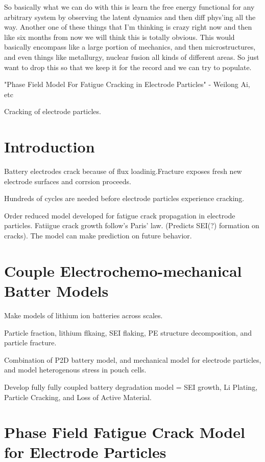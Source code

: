 \documentclass[book.tex]{subfiles}
\begin{document}
So basically what we can do with this is learn the free energy functional for any arbitrary system by observing the latent dynamics and then diff phys'ing all the way. Another one of these things that I'm thinking is crazy right now and then like six months from now we will think this is totally obvious. This would basically encompass like a large portion of mechanics, and then microstructures, and even things like metallurgy, nuclear fusion all kinds of different areas. So just want to drop this so that we keep it for the record and we can try to populate.

"Phase Field Model For Fatigue Cracking in Electrode Particles" - Weilong Ai, etc

Cracking of electrode particles. 

\section{Introduction}

Battery electrodes crack because of flux loadinig.Fracture exposes fresh new electrode surfaces and corrsion proceeds.

Hundreds of cycles are needed before electrode particles experience cracking.

Order reduced model developed for fatigue crack propagation in electrode particles. Fatiigue crack growth follow's Paris' law. (Predicts SEI(?) formation on cracks). The model can make prediction on future behavior.

\section{Couple Electrochemo-mechanical Batter Models}

Make models of lithium ion batteries across scales.

Particle fraction, lithium flkaing, SEI flaking, PE structure decomposition, and particle fracture.

Combination of P2D battery model, and mechanical model for electrode particles, and model heterogenous stress in pouch cells.

Develop fully fully coupled battery degradation model = SEI growth, Li Plating, Particle Cracking, and Loss of Active Material.

\section{Phase Field Fatigue Crack Model for Electrode Particles}
\end{document}
